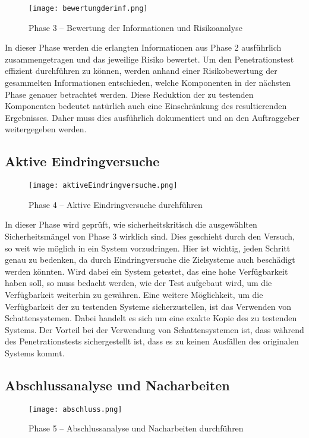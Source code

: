 \begin{figure}[h]
	\centering
	\texttt{[image: bewertungderinf.png]}
	\caption{Phase 3 – Bewertung der Informationen und Risikoanalyse}
\end{figure}

In dieser Phase werden die erlangten Informationen aus Phase 2 ausführlich zusammengetragen und das
jeweilige Risiko bewertet. Um den Penetrationstest effizient durchführen zu können, werden anhand einer
Risikobewertung der gesammelten Informationen entschieden, welche Komponenten in der nächsten Phase
genauer betrachtet werden. Diese Reduktion der zu testenden Komponenten bedeutet natürlich auch eine Einschränkung
des resultierenden Ergebnisses. Daher muss dies ausführlich dokumentiert und an den Auftraggeber
weitergegeben werden\cite[103-104]{pt03bsi}.

\subsection{Aktive Eindringversuche}

\begin{figure}[h]
	\centering
	\texttt{[image: aktiveEindringversuche.png]}
	\caption{Phase 4 – Aktive Eindringversuche durchführen}
\end{figure}

In dieser Phase wird geprüft, wie sicherheitskritisch die ausgewählten Sicherheitsmängel von Phase 3 wirklich
sind. Dies geschieht durch den Versuch, so weit wie möglich in ein System vorzudringen. Hier ist wichtig,
jeden Schritt genau zu bedenken, da durch Eindringversuche die Zielsysteme auch beschädigt werden könnten.
Wird dabei ein System getestet, das eine hohe Verfügbarkeit haben soll, so muss bedacht werden, wie der Test
aufgebaut wird, um die Verfügbarkeit weiterhin zu gewähren. Eine weitere Möglichkeit, um die Verfügbarkeit
der zu testenden Systeme sicherzustellen, ist das Verwenden von Schattensystemen. Dabei handelt es sich um
eine exakte Kopie des zu testenden Systems. Der Vorteil bei der Verwendung von Schattensystemen ist, dass
während des Penetrationstests sichergestellt ist, dass es zu keinen Ausfällen des originalen Systems kommt\cite[104-105]{pt03bsi}.

\subsection{Abschlussanalyse und Nacharbeiten}

\begin{figure}[h]
	\centering
	\texttt{[image: abschluss.png]}
	\caption{Phase 5 – Abschlussanalyse und Nacharbeiten durchführen}
\end{figure}

